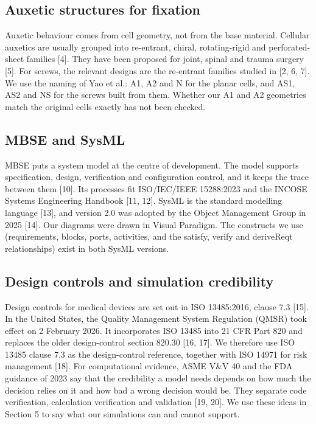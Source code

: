 \documentclass[10pt,twocolumn,letterpaper]{article}
\begin{document}
\subsection{Auxetic structures for fixation}
Auxetic behaviour comes from cell geometry, not from the base material. Cellular auxetics are usually grouped into re-entrant, chiral, rotating-rigid and perforated-sheet families [4]. They have been proposed for joint, spinal and trauma surgery [5]. For screws, the relevant designs are the re-entrant families studied in [2, 6, 7]. We use the naming of Yao et al.: A1, A2 and N for the planar cells, and AS1, AS2 and NS for the screws built from them. Whether our A1 and A2 geometries match the original cells exactly has not been checked.

\subsection{MBSE and SysML}
MBSE puts a system model at the centre of development. The model supports specification, design, verification and configuration control, and it keeps the trace between them [10]. Its processes fit ISO/IEC/IEEE 15288:2023 and the INCOSE Systems Engineering Handbook [11, 12]. SysML is the standard modelling language [13], and version 2.0 was adopted by the Object Management Group in 2025 [14]. Our diagrams were drawn in Visual Paradigm. The constructs we use (requirements, blocks, ports, activities, and the satisfy, verify and deriveReqt relationships) exist in both SysML versions.

\subsection{Design controls and simulation credibility}
Design controls for medical devices are set out in ISO 13485:2016, clause 7.3 [15]. In the United States, the Quality Management System Regulation (QMSR) took effect on 2 February 2026. It incorporates ISO 13485 into 21 CFR Part 820 and replaces the older design-control section 820.30 [16, 17]. We therefore use ISO 13485 clause 7.3 as the design-control reference, together with ISO 14971 for risk management [18]. For computational evidence, ASME V\&V 40 and the FDA guidance of 2023 say that the credibility a model needs depends on how much the decision relies on it and how bad a wrong decision would be. They separate code verification, calculation verification and validation [19, 20]. We use these ideas in Section 5 to say what our simulations can and cannot support.
\end{document}
